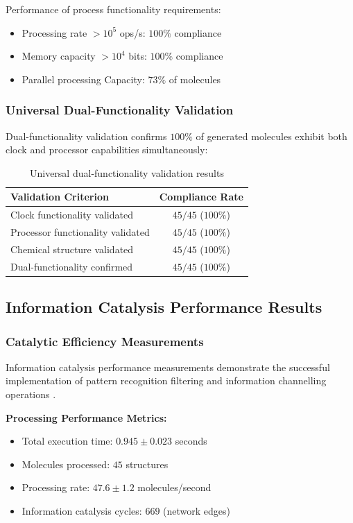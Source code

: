 \documentclass[12pt,a4paper]{article}
\begin{document}
Performance of process functionality requirements:
\begin{itemize}
\item Processing rate $> 10^{5}$ ops/s: $100\%$ compliance
\item Memory capacity $> 10^{4}$ bits: $100\%$ compliance
\item Parallel processing Capacity: $73\%$ of molecules
\end{itemize}

\subsubsection{Universal Dual-Functionality Validation}

Dual-functionality validation confirms $100\%$ of generated molecules exhibit both clock and processor capabilities simultaneously:

\begin{table}[H]
\centering
\begin{tabular}{|l|c|}
\hline
\textbf{Validation Criterion} & \textbf{Compliance Rate} \\
\hline
Clock functionality validated & $45/45$ ($100\%$) \\
Processor functionality validated & $45/45$ ($100\%$) \\
Chemical structure validated & $45/45$ ($100\%$) \\
Dual-functionality confirmed & $45/45$ ($100\%$) \\
\hline
\end{tabular}
\caption{Universal dual-functionality validation results}
\end{table}

\subsection{Information Catalysis Performance Results}

\subsubsection{Catalytic Efficiency Measurements}

Information catalysis performance measurements demonstrate the successful implementation of pattern recognition filtering and information channelling operations \cite{bennett1982thermodynamics}.

\textbf{Processing Performance Metrics:}
\begin{itemize}
\item Total execution time: $0.945 \pm 0.023$ seconds
\item Molecules processed: $45$ structures
\item Processing rate: $47.6 \pm 1.2$ molecules/second
\item Information catalysis cycles: $669$ (network edges)
\end{itemize}
\end{document}

